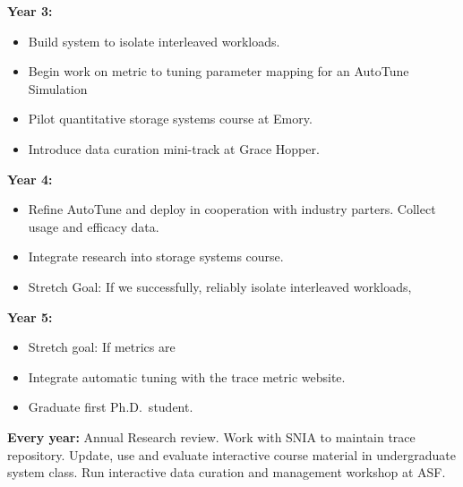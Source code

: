\noindent
\textbf{Year 3:}
\begin{itemize}
\item Build system to isolate interleaved workloads.
\item Begin work on metric to tuning parameter mapping for an AutoTune
Simulation 
\item Pilot quantitative storage systems course at Emory.
\item Introduce data curation mini-track at Grace Hopper.
%
\end{itemize}
\noindent
\textbf{Year 4:} 
%
\begin{itemize}
\item Refine AutoTune and deploy in cooperation with industry parters.  Collect usage and efficacy data.
\item Integrate research into storage systems course. 
\item Stretch Goal: If we successfully, reliably isolate interleaved workloads, 
\end{itemize}
\noindent
\textbf{Year 5:} 
\begin{itemize}
\item Stretch goal: If metrics are 
\item Integrate automatic tuning with the trace metric website.
\item Graduate first Ph.D.~student.
\end{itemize}

\noindent
\textbf{Every year:} Annual Research review.  Work with SNIA to maintain trace
repository.
Update, use and evaluate interactive course material in undergraduate system
class.  Run interactive data curation and management workshop at ASF. %


